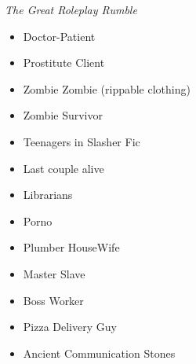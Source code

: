 \emph{The Great Roleplay Rumble}
\begin{itemize}
  \item Doctor-Patient
  \item Prostitute Client
  \item Zombie Zombie (rippable clothing)
  \item Zombie Survivor
  \item Teenagers in Slasher Fic
  \item Last couple alive
  \item Librarians
  \item Porno
  \item Plumber HouseWife
  \item Master Slave
  \item Boss Worker
  \item Pizza Delivery Guy 
  \item Ancient Communication Stones
  
\end{itemize}